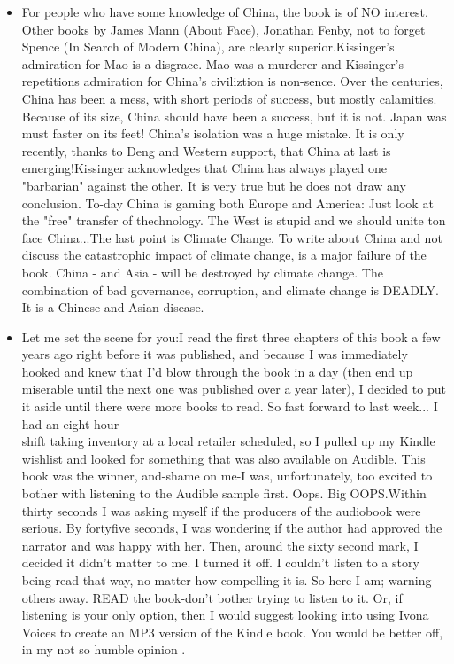 \documentclass[10pt]{book}
\begin{document}
\begin{itemize}
  \item For people who have some knowledge of China, the book is of NO interest. Other books by James Mann (About Face), Jonathan Fenby, not to forget Spence (In Search of Modern China), are clearly superior.Kissinger's admiration for Mao is a disgrace. Mao was a murderer and Kissinger's repetitions admiration for China's civiliztion is non-sence. Over the centuries, China has been a mess, with short periods of success, but mostly calamities. Because of its size, China should have been a success, but it is not. Japan was must faster on its feet! China's isolation was a huge mistake. It is only recently, thanks to Deng and Western support, that China at last is emerging!Kissinger acknowledges that China has always played one "barbarian" against the other. It is very true but he does not draw any conclusion. To-day China is gaming both Europe and America: Just look at the "free" transfer of thechnology. The West is stupid and we should unite ton face China...The last point is Climate Change. To write about China and not discuss the catastrophic impact of climate change, is a major failure of the book. China - and Asia - will be destroyed by climate change. The combination of bad governance, corruption, and climate change is DEADLY. It is a Chinese and Asian disease.
  \item Let me set the scene for you:I read the first three chapters of this book a few years ago right before it was published, and because I was immediately hooked and knew that I'd blow through the book in a day (then end up miserable until the next one was published over a year later), I decided to put it aside until there were more books to read. So fast forward to last week... I had an eight hour\\
shift taking inventory at a local retailer scheduled, so I pulled up my Kindle wishlist and looked for something that was also available on Audible. This book was the winner, and-shame on me-I was, unfortunately, too excited to bother with listening to the Audible sample first. Oops. Big OOPS.Within thirty seconds I was asking myself if the producers of the audiobook were serious. By fortyfive seconds, I was wondering if the author had approved the narrator and was happy with her. Then, around the sixty second mark, I decided it didn't matter to me. I turned it off. I couldn't listen to a story being read that way, no matter how compelling it is. So here I am; warning others away. READ the book-don't bother trying to listen to it. Or, if listening is your only option, then I would suggest looking into using Ivona Voices to create an MP3 version of the Kindle book. You would be better off, in my not so humble opinion .

\end{itemize}
\end{document}
